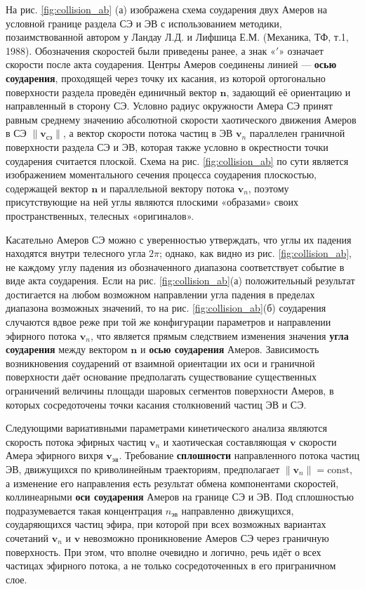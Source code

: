 На рис. \ref{fig:collision_ab} (а) изображена схема соударения двух Амеров на условной границе раздела СЭ и ЭВ с использованием методики, позаимствованной автором у Ландау Л.Д. и Лифшица Е.М. (Механика, ТФ, т.1, 1988). Обозначения скоростей были приведены ранее, а знак «\('\)» означает скорости после акта соударения. Центры Амеров соединены линией — \textbf{осью соударения}, проходящей через точку их касания, из которой ортогонально поверхности раздела проведён единичный вектор \(\mathbf{n}\), задающий её ориентацию и направленный в сторону СЭ. Условно радиус окружности Амера СЭ принят равным среднему значению абсолютной скорости хаотического движения Амеров в СЭ \(\|\mathbf{v}_{\text{сэ}}\|\), а вектор скорости потока частиц в ЭВ \(\mathbf{v}_n\) параллелен граничной поверхности раздела СЭ и ЭВ, которая также условно в окрестности точки соударения считается плоской. Схема на рис. \ref{fig:collision_ab} по сути является изображением моментального сечения процесса соударения плоскостью, содержащей вектор \(\mathbf{n}\) и параллельной вектору потока \(\mathbf{v}_n\), поэтому присутствующие на ней углы являются плоскими «образами» своих пространственных, телесных «оригиналов».

Касательно Амеров СЭ можно с уверенностью утверждать, что углы их падения находятся внутри телесного угла \(2\pi\); однако, как видно из рис. \ref{fig:collision_ab}, не каждому углу падения из обозначенного диапазона соответствует событие в виде акта соударения. Если на рис. \ref{fig:collision_ab}(а) положительный результат достигается на любом возможном направлении угла падения в пределах диапазона возможных значений, то на рис. \ref{fig:collision_ab}(б) соударения случаются вдвое реже при той же конфигурации параметров и направлении эфирного потока \(\mathbf{v}_n\), что является прямым следствием изменения значения \textbf{угла соударения} между вектором \(\mathbf{n}\) и \textbf{осью соударения} Амеров. Зависимость возникновения соударений от взаимной ориентации их оси и граничной поверхности даёт основание предполагать существование существенных ограничений величины площади шаровых сегментов поверхности Амеров, в которых сосредоточены точки касания столкновений частиц ЭВ и СЭ.

Следующими вариативными параметрами кинетического анализа являются скорость потока эфирных частиц \(\mathbf{v}_n\) и хаотическая составляющая \(\mathbf{v}\) скорости Амера эфирного вихря \(\mathbf{v}_{\text{эв}}\). Требование \textbf{сплошности} направленного потока частиц ЭВ, движущихся по криволинейным траекториям, предполагает \(\|\mathbf{v}_n\| = \text{const}\), а изменение его направления есть результат обмена компонентами скоростей, коллинеарными \textbf{оси соударения} Амеров на границе СЭ и ЭВ. Под сплошностью подразумевается такая концентрация \(n_{\text{эв}}\) направленно движущихся, соударяющихся частиц эфира, при которой при всех возможных вариантах сочетаний \(\mathbf{v}_n\) и \(\mathbf{v}\) невозможно проникновение Амеров СЭ через граничную поверхность. При этом, что вполне очевидно и логично, речь идёт о всех частицах эфирного потока, а не только сосредоточенных в его приграничном слое.

